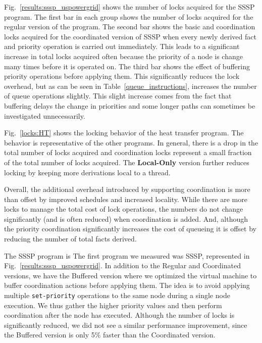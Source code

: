 Fig.~\ref{results:sssp_uspowergrid} shows the number of locks acquired
for the SSSP program.  The first bar in each group shows the number of
locks acquired for the regular version of the program.  The
second bar shows the basic and coordination locks acquired for the coordinated
version of SSSP when every newly derived fact and priority operation is carried out
immediately.  This leads to a significant increase in total locks
acquired often because the priority of a node is change many times
before it is operated on.  The third bar shows the effect of buffering
priority operations before applying them.  This significantly reduces
the lock overhead, but as can be seen in
Table~\ref{queue_instructions}, increases the number of queue operations
slightly.  This slight increase comes from the fact that buffering
delays the change in priorities and some longer paths can sometimes be
investigated unnecessarily.

Fig.~\ref{locks:HT} shows the locking behavior of the heat transfer
program.  The behavior is representative of the other programs. In general, there
is a drop in the total number of locks acquired and coordination locks
represent a small fraction of the total number of locks acquired.  The \textbf{Local-Only}
version further reduces locking by keeping more derivations local
to a thread.

Overall, the additional overhead introduced by supporting coordination
is more than offset by improved schedules and increased locality.
While there are more locks to manage the total cost of lock operations,
the numbers do not change significantly (and is often reduced) when coordination
is added.  And, although the priority coordination significantly
increases the cost of queueing it is offset by reducing the number of
total facts derived.


\iffalse

  The
SSSP program is The first program we measured was SSSP, represented in
Fig.~\ref{results:sssp_uspowergrid}. In addition to the Regular and
Coordinated versions, we have the Buffered version where we optimized
the virtual machine to buffer coordination actions before applying
them. The idea is to avoid applying multiple \texttt{set-priority}
operations to the same node during a single node execution. We thus
gather the higher priority values and then perform coordination after
the node has executed.  Although the number of locks is significantly
reduced, we did not see a similar performance improvement, since the
Buffered version is only 5\% faster than the Coordinated version.


